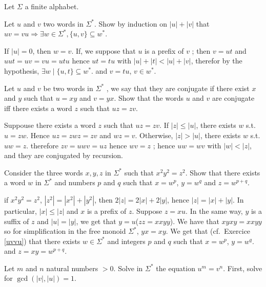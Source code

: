 \documentclass[a4paper,11pt]{exam}
\begin{document}
	Let $\Sigma$ a finite alphabet.
\begin{questions}
	

  \question \label{uvvu}
  Let $u$ and $v$ two words in $\Sigma^*$. 
  Show  by induction on $|u| + |v|$
  that $uv=vu \Rightarrow {\exists w \in \Sigma^*,} \{u,v\} \subseteq w^*$.

  \begin{solution}
    If $|u|=0$, then $w=v$.
    If, we suppose that $u$ is a prefix of $v$ ; 
    then $v=ut$ and $uut=uv=vu=utu$ hence $ut=tu$ with $|u|+|t|<|u|+|v|$,
    therefor by the hypothesis, $\exists w \mid \{u,t\} \subseteq w^*$.
    and $v=tu$, $v \in w^*$.
  \end{solution}

  \question
  Let $u$ and $v$ be two words in $\Sigma^*$ , we say that they are conjugate if there exist 
  $x$ and $y$ such that $u=xy$ and $v=yx$.
  Show that the words $u$ and $v$ are conjugate iff there exists a word $z$ such that $uz = zv$.

  \begin{solution}
    Suppouse there exists a word $z$ such that $uz = zv$. If $|z| \leq |u|$,
    there exists $w$ s.t. $u = zw$.
    Hence $uz = zwz = zv$ and $wz = v$.
    Otherwise, $|z| > |u|$, there exists $w$ s.t. $uw = z$.
    therefore $zv = uwv = uz$ hence $wv = z$ ; hence $uw = wv$ with $|w| < |z|$,
    and they are conjugated by recursion.
  \end{solution}

  \question
  Consider the three words $x,y,z$ in $\Sigma^*$ such that $x^2y^2=z^2$.
  Show that there exists a word $w$ in $\Sigma^*$ and numbers $p$ and $q$
  such that $x=w^p$, $y=w^q$ and $z=w^{p+q}$.

  \begin{solution}
    if $x^2 y^2 = z^2$, $|z^2| = |x^2| + |y^2|$, then $2|z| = 2|x| + 2|y|$,
    hence $|z| = |x| + |y|$.
    In particular, $|x| \leq |z|$ and $x$ is a prefix of $z$.
    Suppose $z=xu$.
    In the same way, $y$ is a suffix of $z$ and $|u|=|y|$, we get that $y=u$($zz=xxyy$).
    We have that $xyxy=xxyy$ so for simplification in
    the free monoid $\Sigma^*$, $yx=xy$.
    We get that (cf.\ Exercice \ref{uvvu}) that there exists
    $w \in \Sigma^*$ and integers $p$ and $q$ such that $x=w^p$, $y=w^q$.
    and $z=xy=w^{p+q}$.
  \end{solution}

\question
Let $m$ and $n$ natural numbers $>0$.
Solve in $\Sigma^*$ the equation $u^m = v^n$. First, solve for $\gcd(|v|,|u|)=1$.


\end{questions}
\end{document}
